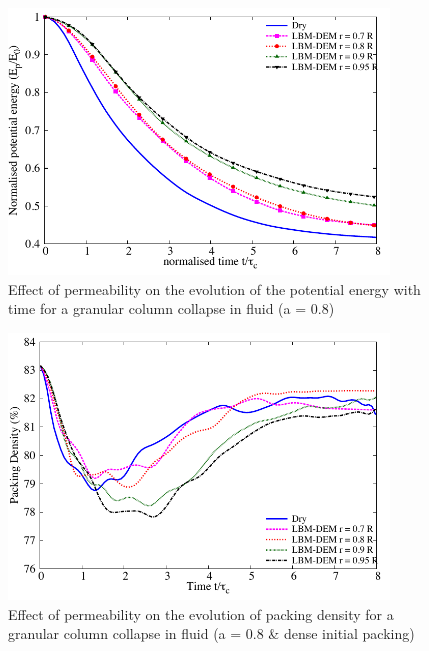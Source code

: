 \begin{figure}
	\centering
    \includegraphics[width=0.9\textwidth]{PE_a08_dense}
    \caption{Effect of permeability on the evolution of the potential energy 
    with time for a granular column collapse in fluid (a = 0.8)}
    \label{fig:PE_a08_dense}
\end{figure}

\begin{figure}
	\centering
    \includegraphics[width=0.9\textwidth]{Packing_Density_a08_dense}
    \caption{Effect of permeability on the evolution of packing density for a 
    granular column collapse in fluid (a = 0.8 \& dense initial packing)}
    \label{fig:Packing_Density_a08_dense}
\end{figure}

